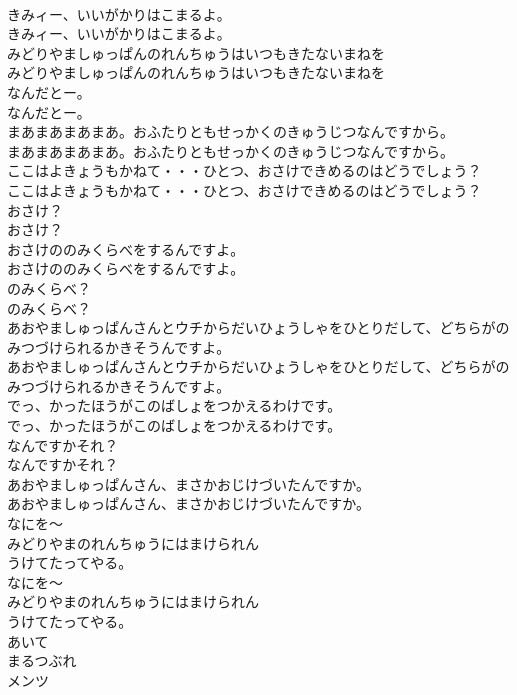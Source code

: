 \documentclass[8pt]{extreport}
\begin{document}
\begin{CJK}{UTF8}{min}
\\	きみィー、いいがかりはこまるよ。
\\	きみィー、いいがかりはこまるよ。
\\	みどりやましゅっぱんのれんちゅうはいつもきたないまねを
\\	みどりやましゅっぱんのれんちゅうはいつもきたないまねを
\\	なんだとー。
\\	なんだとー。
\\	まあまあまあまあ。おふたりともせっかくのきゅうじつなんですから。
\\	まあまあまあまあ。おふたりともせっかくのきゅうじつなんですから。
\\	ここはよきょうもかねて・・・ひとつ、おさけできめるのはどうでしょう？
\\	ここはよきょうもかねて・・・ひとつ、おさけできめるのはどうでしょう？
\\	おさけ？
\\	おさけ？
\\	おさけののみくらべをするんですよ。
\\	おさけののみくらべをするんですよ。
\\	のみくらべ？
\\	のみくらべ？
\\	あおやましゅっぱんさんとウチからだいひょうしゃをひとりだして、どちらがのみつづけられるかきそうんですよ。
\\	あおやましゅっぱんさんとウチからだいひょうしゃをひとりだして、どちらがのみつづけられるかきそうんですよ。
\\	でっ、かったほうがこのばしょをつかえるわけです。
\\	でっ、かったほうがこのばしょをつかえるわけです。
\\	なんですかそれ？
\\	なんですかそれ？
\\	あおやましゅっぱんさん、まさかおじけづいたんですか。
\\	あおやましゅっぱんさん、まさかおじけづいたんですか。
\\	なにを〜
\\	みどりやまのれんちゅうにはまけられん
\\	うけてたってやる。
\\	なにを〜
\\	みどりやまのれんちゅうにはまけられん
\\	うけてたってやる。
\\	あいて
\\	まるつぶれ
\\	メンツ

\end{CJK}
\end{document}
